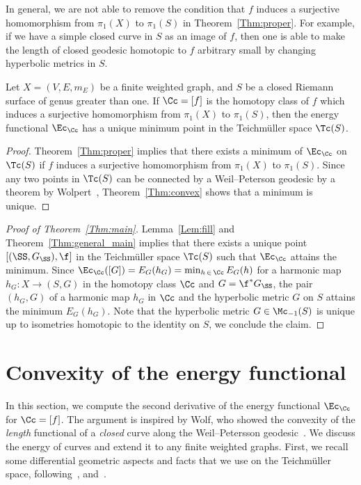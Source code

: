In general, we are not able to remove the condition that $f$ induces a surjective homomorphism from $\pi_1(X)$ to $\pi_1(S)$ in Theorem~\ref{Thm:proper}. For example, if we have a simple closed curve in $S$ as an image of $f$, then one is able to make the length of closed geodesic homotopic to $f$ arbitrary small by changing hyperbolic metrics in $S$.



\begin{theo}\label{Thm:general_main}
Let $X=(V, E, m_E)$ be a finite weighted graph, and $S$ be a closed Riemann surface of genus greater than one. If $\Cc=[f]$ is the homotopy class of $f$ which induces a surjective homomorphism from $\pi_1(X)$ to $\pi_1(S)$, then the energy functional $\Ec_\Cc$ has a unique minimum point in the Teichm\"uller space $\Tc(S)$.
\end{theo}


\begin{proof}
Theorem~\ref{Thm:proper} implies that there exists a minimum of $\Ec_\Cc$ on $\Tc(S)$ if $f$ induces a surjective homomorphism from $\pi_1(X)$ to $\pi_1(S)$. Since any two points in $\Tc(S)$ can be connected by a Weil--Peterson geodesic by a theorem by Wolpert~\cite[Corollary~5.6]{WolpertNielsen}, Theorem~\ref{Thm:convex} shows that a minimum is unique.
\end{proof}


\begin{proof}[{Proof of Theorem~\ref{Thm:main}}]
Lemma~\ref{Lem:fill} and Theorem~\ref{Thm:general_main} implies that there exists a unique point $[(\SS, G_{\SS}), \f]$ in the Teichm\"uller space $\Tc(S)$ such that $\Ec_\Cc$ attains the minimum. Since $\Ec_\Cc([G])=E_{G}(h_G)=\min_{h\,\in\,\Cc}E_G(h)$ for a harmonic map $h_G:X \to (S, G)$ in the homotopy class $\Cc$ and $G=\f^\ast G_{\SS}$, the pair $(h_G, G)$ of a harmonic map $h_G$ in $\Cc$ and the hyperbolic metric $G$ on $S$ attains the minimum $E_G(h_G)$. Note that the hyperbolic metric $G \in \Mc_{-1}(S)$ is unique up to isometries homotopic to the identity on $S$, we conclude the claim.
\end{proof}



\section{Convexity of the energy functional}\label{Sec:convex}

In this section, we compute the second derivative of the energy functional $\Ec_\Cc$ for $\Cc=[f]$. The argument is inspired by Wolf, who showed the convexity of the \emph{length} functional of a \emph{closed} curve along the Weil--Petersson geodesic~\cite{Wolf}. We discuss the energy of curves and extend it to any finite weighted graphs. First, we recall some differential geometric aspects and facts that we use on the Teichm\"uller space, following~\cite{Yamada}, \cite{Yamada2} and~\cite{Wolf}.


